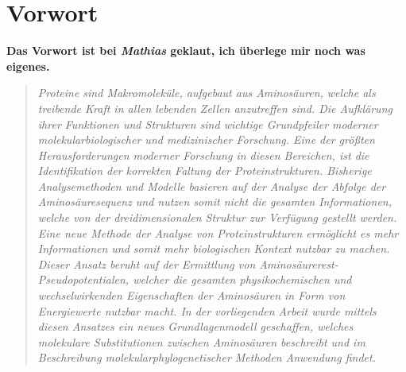 \chapter{Vorwort}

\textbf{Das Vorwort ist bei \emph{Mathias} geklaut, ich überlege mir noch was eigenes.}
\begin{quote}
\textit{Proteine sind Makromoleküle, aufgebaut aus Aminosäuren, welche als treibende Kraft in allen
lebenden Zellen anzutreffen sind. Die Aufklärung ihrer Funktionen und Strukturen sind wichtige
Grundpfeiler moderner molekularbiologischer und medizinischer Forschung. Eine der größten
Herausforderungen moderner Forschung in diesen Bereichen, ist die Identifikation der korrekten
Faltung der Proteinstrukturen. Bisherige Analysemethoden und Modelle basieren auf der Analyse
der Abfolge der Aminosäuresequenz und nutzen somit nicht die gesamten Informationen,
welche von der dreidimensionalen Struktur zur Verfügung gestellt werden.
Eine neue Methode der Analyse von Proteinstrukturen ermöglicht es mehr Informationen und somit
mehr biologischen Kontext nutzbar zu machen. Dieser Ansatz beruht auf der Ermittlung von
Aminosäurerest-Pseudopotentialen, welcher die gesamten physikochemischen und wechselwirkenden
Eigenschaften der Aminosäuren in Form von Energiewerte nutzbar macht. In der vorliegenden
Arbeit wurde mittels diesen Ansatzes ein neues Grundlagenmodell geschaffen, welches
molekulare Substitutionen zwischen Aminosäuren beschreibt und im Beschreibung molekularphylogenetischer
Methoden Anwendung findet.}
\end{quote}






